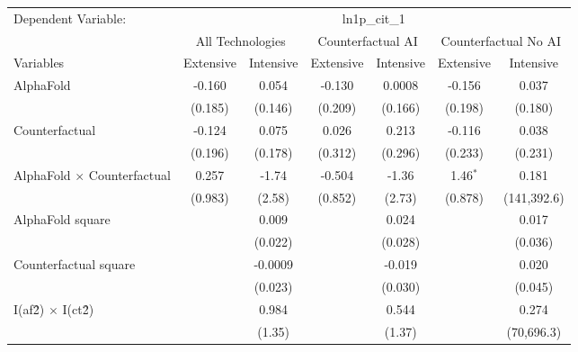 \begingroup
\centering
\begin{tabular}{lcccccc}
   \tabularnewline \midrule \midrule
   Dependent Variable: & \multicolumn{6}{c}{ln1p\_cit\_1}\\
 & \multicolumn{2}{c}{All Technologies} & \multicolumn{2}{c}{Counterfactual AI} & \multicolumn{2}{c}{Counterfactual No AI} \\
\cmidrule(lr){1-1}\cmidrule(lr){2-3} \cmidrule(lr){4-5} \cmidrule(lr){6-7}
Variables & \multicolumn{1}{c}{Extensive} & \multicolumn{1}{c}{Intensive} & \multicolumn{1}{c}{Extensive} & \multicolumn{1}{c}{Intensive} & \multicolumn{1}{c}{Extensive} & \multicolumn{1}{c}{Intensive} \\
\cmidrule(lr){1-1}\cmidrule(lr){2-2} \cmidrule(lr){3-3} \cmidrule(lr){4-4} \cmidrule(lr){5-5} \cmidrule(lr){6-6} \cmidrule(lr){7-7}
   AlphaFold                          & -0.160  & 0.054   & -0.130  & 0.0008  & -0.156     & 0.037\\   
                                      & (0.185) & (0.146) & (0.209) & (0.166) & (0.198)    & (0.180)\\   
   Counterfactual                     & -0.124  & 0.075   & 0.026   & 0.213   & -0.116     & 0.038\\   
                                      & (0.196) & (0.178) & (0.312) & (0.296) & (0.233)    & (0.231)\\   
   AlphaFold $\times$ Counterfactual  & 0.257   & -1.74   & -0.504  & -1.36   & 1.46$^{*}$ & 0.181\\   
                                      & (0.983) & (2.58)  & (0.852) & (2.73)  & (0.878)    & (141,392.6)\\   
   AlphaFold square                   &         & 0.009   &         & 0.024   &            & 0.017\\   
                                      &         & (0.022) &         & (0.028) &            & (0.036)\\   
   Counterfactual square              &         & -0.0009 &         & -0.019  &            & 0.020\\   
                                      &         & (0.023) &         & (0.030) &            & (0.045)\\   
   I(af\^2) $\times$ I(ct\^2)         &         & 0.984   &         & 0.544   &            & 0.274\\   
                                      &         & (1.35)  &         & (1.37)  &            & (70,696.3)\\   
   \midrule

\end{tabular}

